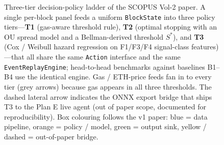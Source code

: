 \begin{figure}[t]
  \caption{Three-tier decision-policy ladder of the SCOPUS Vol-2 paper.
    A single per-block panel feeds a uniform \texttt{BlockState} into
    three policy tiers---\textbf{T1} (gas-aware threshold rule),
    \textbf{T2} (optimal stopping with an OU spread model and a
    Bellman-derived threshold $S^{*}$), and \textbf{T3} (Cox / Weibull
    hazard regression on F1/F3/F4 signal-class features)---that all
    share the same \texttt{Action} interface and the same
    \texttt{EventReplayEngine}; head-to-head benchmarks against
    baselines B1--B4 use the identical engine. Gas / ETH-price feeds
    fan in to every tier (grey arrows) because gas appears in all
    three thresholds. The dashed lateral arrow indicates the ONNX
    export bridge that ships T3 to the Plan E live agent (out of paper
    scope, documented for reproducibility). Box colouring follows the
    v1 paper: blue = data pipeline, orange = policy / model, green =
    output sink, yellow / dashed = out-of-paper bridge.}
  \label{fig:t1t2t3-ladder}
\end{figure}
